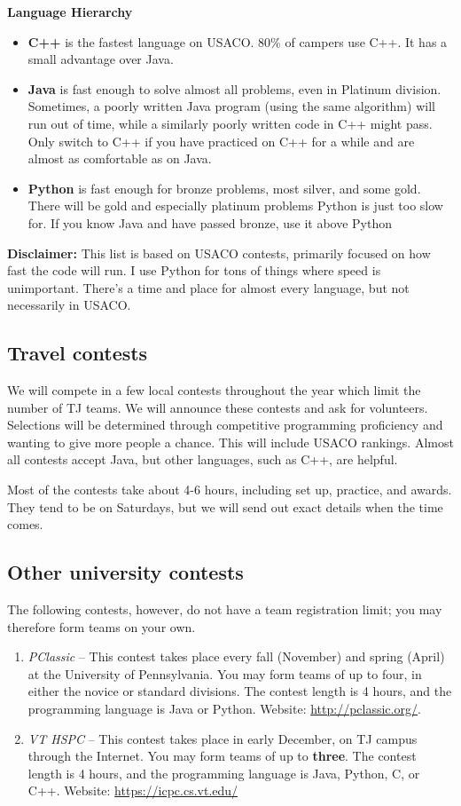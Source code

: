 \documentclass{article}
\begin{document}
\textbf{Language Hierarchy}
\begin{itemize}
    \item \textbf{C++} is the fastest language on USACO.  80\% of campers use C++.  It has a small advantage over Java.
    \item \textbf{Java} is fast enough to solve almost all problems, even in Platinum division.  Sometimes, a poorly written Java program (using the same algorithm) will run out of time, while a similarly poorly written code in C++ might pass.  Only switch to C++ if you have practiced on C++ for a while and are almost as comfortable as on Java.
    \item \textbf{Python} is fast enough for bronze problems, most silver, and some gold.  There will be gold and especially platinum problems Python is just too slow for.  If you know Java and have passed bronze, use it above Python
\end{itemize}

\textbf{Disclaimer:} This list is based on USACO contests, primarily focused on how fast the code will run.  I use Python for tons of things where speed is unimportant.  There's a time and place for almost every language, but not necessarily in USACO.


\subsection{Travel contests}

We will compete in a few local contests throughout the year which limit the number of TJ teams.  We will announce these contests and ask for volunteers.  Selections will be determined through competitive programming proficiency and wanting to give more people a chance. This will include USACO rankings.  Almost all contests accept Java, but other languages, such as C++, are helpful.

Most of the contests take about 4-6 hours, including set up, practice, and awards.  They tend to be on Saturdays, but we will send out exact details when the time comes.


\subsection{Other university contests}

The following contests, however, do not have a team registration limit; you may therefore form teams on your own.

\begin{enumerate}
    \item \textit{PClassic} -- This contest takes place every fall (November) and spring (April) at the University of Pennsylvania. You may form teams of up to four, in either the novice or standard divisions. The contest length is 4 hours, and the programming language is Java or Python. Website: \url{http://pclassic.org/}.
    \item \textit{VT HSPC} -- This contest takes place in early December, on TJ campus through the Internet. You may form teams of up to \textbf{three}. The contest length is 4 hours, and the programming language is Java, Python, C, or C++. Website: \url{https://icpc.cs.vt.edu/}
\end{enumerate}
\end{document}
